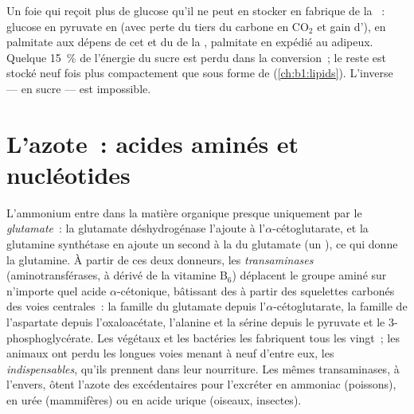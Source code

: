 \begin{example}\label{ex:b1:biosyntheses-integration:fatfromsugar}
Un foie qui reçoit plus de glucose qu'il ne peut en stocker en 
fabrique de la ~: glucose en pyruvate en  (avec perte
du tiers du carbone en $\mathrm{CO_2}$ et gain d'),  en
palmitate aux dépens de cet  et du  de la , palmitate en  expédié au  adipeux. Quelque
\qty{15}{\%} de l'énergie du sucre est perdu dans la conversion~; le
reste est stocké neuf fois plus compactement que sous forme de 
(\cref{ch:b1:lipids}). L'inverse ---  en sucre --- est
impossible.
\end{example}

\section{L'azote~: acides aminés et nucléotides}

\begin{definition}\label{def:b1:biosyntheses-integration:nitrogen}
L'ammonium entre dans la matière organique presque uniquement par le
\emph{glutamate}~: la glutamate déshydrogénase l'ajoute à
l'$\alpha$-cétoglutarate, et la glutamine synthétase en ajoute un
second à la  du glutamate (un ), ce qui donne la
glutamine. À partir de ces deux donneurs, les \emph{transaminases}
(aminotransférases, à  dérivé de la vitamine B$_6$) déplacent le
groupe aminé sur n'importe quel acide $\alpha$-cétonique, bâtissant des
 à partir des squelettes carbonés des voies centrales~: la
famille du glutamate depuis l'$\alpha$-cétoglutarate, la famille de
l'aspartate depuis l'oxaloacétate, l'alanine et la sérine depuis le
pyruvate et le 3-phosphoglycérate. Les végétaux et les bactéries les
fabriquent tous les vingt~; les animaux ont perdu les longues voies
menant à neuf d'entre eux, les  \emph{indispensables},
qu'ils prennent dans leur nourriture. Les mêmes transaminases, à
l'envers, ôtent l'azote des  excédentaires pour l'excréter
en ammoniac (poissons), en urée (mammifères) ou en acide urique
(oiseaux, insectes).
\end{definition}

